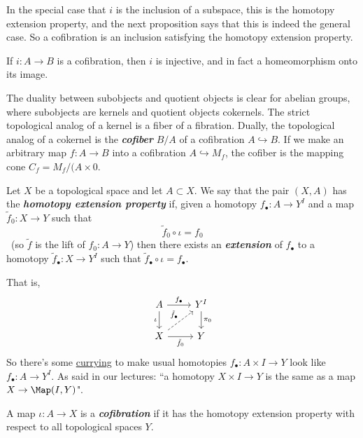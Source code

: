 \begin{remark}
\begin{defn}[Hatcher]
	In the special case that $i$ is the inclusion of a subspace, this is the homotopy extension property, and the next proposition says that this is indeed the general case. So a cofibration is an inclusion satisfying the homotopy extension property.
\end{defn}

\begin{prop}[4H.1]
	If $i:A\to B$ is a cofibration, then $i$ is injective, and in fact a homeomorphism onto its image.
\end{prop}

\begin{remark}
	The duality between subobjects and quotient objects is clear for abelian groups, where subobjects are kernels and quotient objects cokernels. The strict topological analog of a kernel is a fiber of a fibration. Dually, the topological analog of a cokernel is the \textit{\textbf{cofiber}} $B/A$ of a cofibration $A\hookrightarrow B$. If we make an arbitrary map  $f:A\to B$ into a cofibration $A\hookrightarrow M_{f}$, the cofiber is the mapping cone $C_{f}=M_{f}/(A\times {0}$.
\end{remark}

\begin{defn}
	Let $X$ be a topological space and let $A\subset X$. We say that the pair $(X,A)$ has the \textbf{\textit{homotopy extension property}} if, given a homotopy $f_\bullet:A\to Y^I$ and a map $\tilde{f}_0:X\to Y$ such that
		\[\tilde{f}_0\circ\iota=f_0\]\
		{\color{cyan}(so $\tilde{f}$ is the lift of $f_0:A\to Y$)} then there exists an \textbf{\textit{extension}} of $f_\bullet$ to a homotopy $\tilde{f}_\bullet:X\to Y^I$ such that $\tilde{f}_\bullet\circ\iota=f_\bullet$.
		
		That is,
		\[\begin{tikzcd}
			A\arrow[r,"f_\bullet"]\arrow[d,swap,"\iota"]&Y^I\arrow[d,"\pi_0"]\\
			X\arrow[ur,dashed,"\tilde{f}_\bullet"]\arrow[r,swap,"\tilde{f}_0"]&Y
		\end{tikzcd}\]
		{\color{persimmon}So there's some \href{https://en.wikipedia.org/wiki/Currying#Function_spaces}{currying} to make usual homotopies $f_\bullet:A\times I\to Y$ look like $f_\bullet:A\to Y^I$. As said in our lectures: ``a homotopy $X\times I\to Y$ is the same as a map $X\to \Map(I,Y)$".}

	A map $\iota:A\to X$ is a \textit{\textbf{cofibration}} if it has the homotopy extension property with respect to all topological spaces  $Y$.
\end{defn}


\end{remark}
